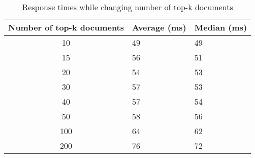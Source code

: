 \begin{table}[h]
    \centering
    \begin{tabular}{c|l|l}
     Number of top-k documents & Average (ms) & Median (ms) \\ \hline
    10                         & 49           & 49          \\ \hline
    15                         & 56           & 51          \\ \hline
    20                         & 54           & 53          \\ \hline
    30                         & 57           & 53          \\ \hline
    40                         & 57           & 54          \\ \hline
    50                         & 58           & 56          \\ \hline
    100                        & 64           & 62          \\ \hline
    200                        & 76           & 72          \\ \hline
    \end{tabular}
    \caption{Response times while changing number of top-k documents}
    \label{tbl:query-expansion-topk}
\end{table}
